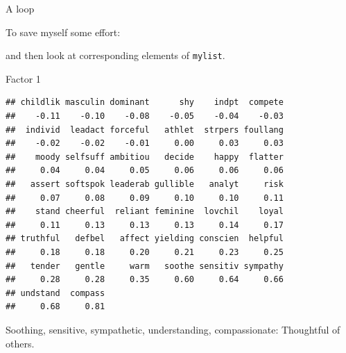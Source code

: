 \begin{frame}[fragile]{A loop}
  
  To save myself some effort:
  
\begin{knitrout}
\color{fgcolor}\begin{kframe}
\begin{alltt}
\hlkwb{=}\hlstd{(}\hlstd{())}
   \hlopt{:}\hlstd{)}
\hlstd{\{}
  \hlkwb{=}\hlopt{$}
  \hlkwb{=}\hlstd{)}
\hlstd{\}}
\end{alltt}
\end{kframe}
\end{knitrout}


and then look at corresponding elements of \texttt{mylist}.
  
\end{frame}

\begin{frame}[fragile]{Factor 1}

  {\footnotesize
\begin{knitrout}
\color{fgcolor}\begin{kframe}
\begin{alltt}
\hlstd{mylist[[}\hlstd{]]}
\end{alltt}
\begin{verbatim}
## childlik masculin dominant      shy    indpt  compete 
##    -0.11    -0.10    -0.08    -0.05    -0.04    -0.03 
##  individ  leadact forceful   athlet  strpers foullang 
##    -0.02    -0.02    -0.01     0.00     0.03     0.03 
##    moody selfsuff ambitiou   decide    happy  flatter 
##     0.04     0.04     0.05     0.06     0.06     0.06 
##   assert softspok leaderab gullible   analyt     risk 
##     0.07     0.08     0.09     0.10     0.10     0.11 
##    stand cheerful  reliant feminine  lovchil    loyal 
##     0.11     0.13     0.13     0.13     0.14     0.17 
## truthful   defbel   affect yielding conscien  helpful 
##     0.18     0.18     0.20     0.21     0.23     0.25 
##   tender   gentle     warm   soothe sensitiv sympathy 
##     0.28     0.28     0.35     0.60     0.64     0.66 
## undstand  compass 
##     0.68     0.81
\end{verbatim}
\end{kframe}
\end{knitrout}
}

Soothing, sensitive, sympathetic, understanding, compassionate:
Thoughtful of others.
  
\end{frame}

